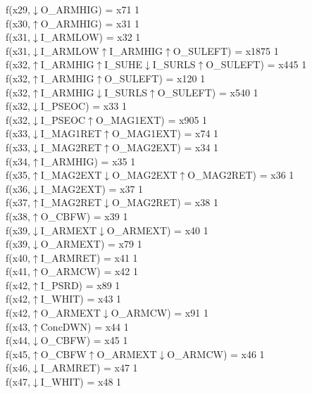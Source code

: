 f(x29,$\downarrow$O\_ARMHIG) = x71 {1} \\
f(x30,$\uparrow$O\_ARMHIG) = x31 {1} \\
f(x31,$\downarrow$I\_ARMLOW) = x32 {1} \\
f(x31,$\downarrow$I\_ARMLOW$\uparrow$I\_ARMHIG$\uparrow$O\_SULEFT) = x1875 {1} \\
f(x32,$\uparrow$I\_ARMHIG$\uparrow$I\_SUHE$\downarrow$I\_SURLS$\uparrow$O\_SULEFT) = x445 {1} \\
f(x32,$\uparrow$I\_ARMHIG$\uparrow$O\_SULEFT) = x120 {1} \\
f(x32,$\uparrow$I\_ARMHIG$\downarrow$I\_SURLS$\uparrow$O\_SULEFT) = x540 {1} \\
f(x32,$\downarrow$I\_PSEOC) = x33 {1} \\
f(x32,$\downarrow$I\_PSEOC$\uparrow$O\_MAG1EXT) = x905 {1} \\
f(x33,$\downarrow$I\_MAG1RET$\uparrow$O\_MAG1EXT) = x74 {1} \\
f(x33,$\downarrow$I\_MAG2RET$\uparrow$O\_MAG2EXT) = x34 {1} \\
f(x34,$\uparrow$I\_ARMHIG) = x35 {1} \\
f(x35,$\uparrow$I\_MAG2EXT$\downarrow$O\_MAG2EXT$\uparrow$O\_MAG2RET) = x36 {1} \\
f(x36,$\downarrow$I\_MAG2EXT) = x37 {1} \\
f(x37,$\uparrow$I\_MAG2RET$\downarrow$O\_MAG2RET) = x38 {1} \\
f(x38,$\uparrow$O\_CBFW) = x39 {1} \\
f(x39,$\downarrow$I\_ARMEXT$\downarrow$O\_ARMEXT) = x40 {1} \\
f(x39,$\downarrow$O\_ARMEXT) = x79 {1} \\
f(x40,$\uparrow$I\_ARMRET) = x41 {1} \\
f(x41,$\uparrow$O\_ARMCW) = x42 {1} \\
f(x42,$\uparrow$I\_PSRD) = x89 {1} \\
f(x42,$\uparrow$I\_WHIT) = x43 {1} \\
f(x42,$\uparrow$O\_ARMEXT$\downarrow$O\_ARMCW) = x91 {1} \\
f(x43,$\uparrow$ConcDWN) = x44 {1} \\
f(x44,$\downarrow$O\_CBFW) = x45 {1} \\
f(x45,$\uparrow$O\_CBFW$\uparrow$O\_ARMEXT$\downarrow$O\_ARMCW) = x46 {1} \\
f(x46,$\downarrow$I\_ARMRET) = x47 {1} \\
f(x47,$\downarrow$I\_WHIT) = x48 {1} \\
